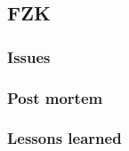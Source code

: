 
\subsection{FZK}
\label{sec:site:fzk}

\subsubsection{Issues}
\label{sec:site:fzk:Issues}

\subsubsection{Post mortem}
\label{sec:site:fzk:postmortem}

\subsubsection{Lessons learned}
\label{sec:site:fzk:lessons}
